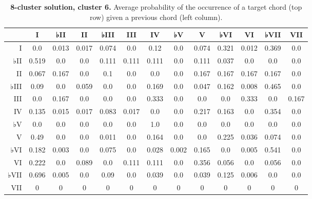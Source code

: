 \begin{table}[htbp]
\begin{minipage}{\linewidth}
\setlength{\tymax}{0.5\linewidth}
\centering
\small
\caption{\textbf{8-cluster solution, cluster 6.} Average probability of the occurrence of a target chord (top row) given a previous chord (left column).}
\label{8-clustersolutioncluster6.averageprobabilityoftheoccurrenceofatargetchordtoprowgivenapreviouschordleftcolumn.}
\begin{tabulary}{\textwidth}{@{}RCCCCCCCCCCCC@{}} \toprule
&I&♭II&II&♭III&III&IV&♭V&V&♭VI&VI&♭VII&VII\\
\midrule
I&0.0&0.013&0.017&0.074&0.0&0.12&0.0&0.074&0.321&0.012&0.369&0.0\\
♭II&0.519&0.0&0.0&0.111&0.111&0.111&0.0&0.111&0.037&0.0&0.0&0.0\\
II&0.067&0.167&0.0&0.1&0.0&0.0&0.0&0.167&0.167&0.167&0.167&0.0\\
♭III&0.09&0.0&0.059&0.0&0.0&0.169&0.0&0.047&0.162&0.008&0.465&0.0\\
III&0.0&0.167&0.0&0.0&0.0&0.333&0.0&0.0&0.0&0.333&0.0&0.167\\
IV&0.135&0.015&0.017&0.083&0.017&0.0&0.0&0.217&0.163&0.0&0.354&0.0\\
♭V&0.0&0.0&0.0&0.0&0.0&1.0&0.0&0.0&0.0&0.0&0.0&0.0\\
V&0.49&0.0&0.0&0.011&0.0&0.164&0.0&0.0&0.225&0.036&0.074&0.0\\
♭VI&0.182&0.003&0.0&0.075&0.0&0.028&0.002&0.165&0.0&0.005&0.541&0.0\\
VI&0.222&0.0&0.089&0.0&0.111&0.111&0.0&0.356&0.056&0.0&0.056&0.0\\
♭VII&0.696&0.005&0.0&0.09&0.0&0.039&0.0&0.039&0.125&0.006&0.0&0.0\\
VII&0&0&0&0&0&0&0&0&0&0&0&0\\

\bottomrule

\end{tabulary}
\end{minipage}
\end{table}


